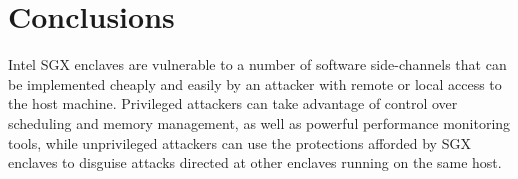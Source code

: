 \section{Conclusions}

Intel SGX enclaves are vulnerable to a number of software side-channels that can be implemented cheaply and easily by an attacker with remote or local access to the host machine. Privileged attackers can take advantage of control over scheduling and memory management, as well as powerful performance monitoring tools, while unprivileged attackers can use the protections afforded by SGX enclaves to disguise attacks directed at other enclaves running on the same host. 
